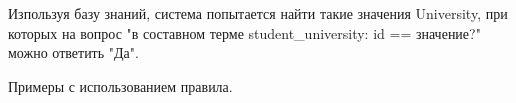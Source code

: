 \documentclass[12pt, a4paper]{extarticle}
\begin{document}
\begin{figure}[h!]
	\begin{minipage}[h]{0.33\linewidth}
	\end{minipage}
	\hfill
	\begin{minipage}[h]{0.31\linewidth}
	\end{minipage}
	\hfill
	\begin{minipage}[h]{0.31\linewidth}
	\end{minipage}
\end{figure}\par
Изпользуя базу знаний, система попытается найти такие значения University, при которых на вопрос "в составном терме student\_university: id == значение?" можно ответить "Да".\par
Примеры с использованием правила.
\end{document}
